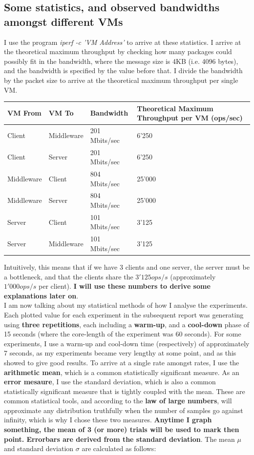 \documentclass[11pt,a4paper]{article}
\begin{document}
\subsection{Some statistics, and observed bandwidths amongst different VMs}
I use the program \textit{iperf -c 'VM Address'} to arrive at these statistics.
I arrive at the theoretical maximum throughput by checking how many packages could possibly fit in the bandwidth, where the message size is 4KB (i.e. 4096 bytes), and the bandwidth is specified by the value before that.
I divide the bandwidth by the packet size to arrive at the theoretical maximum throughput per single VM.

\begin{center}
    \begin{tabular}{| l | l | l | l |}
    \hline
    VM From & VM To & Bandwidth & Theoretical Maximum Throughput per VM (ops/sec)\\ \hline
    Client & Middleware & 201 Mbits/sec &  6'250 \\ \hline
    Client & Server & 201 Mbits/sec & 6'250 \\ \hline
    Middleware & Client & 804 Mbits/sec & 25'000 \\ \hline
    Middleware & Server & 804 Mbits/sec & 25'000 \\ \hline
    Server & Client & 101 Mbits/sec &  3'125 \\ \hline
    Server & Middleware & 101 Mbits/sec & 3'125 \\
    \hline
    \end{tabular}
\end{center}

Intuitively, this means that if we have 3 clients and one server, the server must be a bottleneck, and that the clients share the $3'125 ops/s$ (approximately $1'000ops/s$ per client).
\textbf{I will use these numbers to derive some explanations later on}.\\

I am now talking about my statistical methods of how I analyse the experiments.
Each plotted value for each experiment in the subsequent report was generating using \textbf{three repetitions}, each including a \textbf{warm-up}, and a \textbf{cool-down} phase of 15 seconds (where the core-length of the experiment was 60 seconds).
For some experiments, I use a warm-up and cool-down time (respectively) of approximately 7 seconds, as my experiments became very lengthy at some point, and as this showed to give good results.
To arrive at a single rate amongst rates, I use the \textbf{arithmetic mean}, which is a common statistically significant measure.
As an \textbf{error mesaure}, I use the standard deviation, which is also a common statistically significant measure that is tightly coupled with the mean.
These are common statistical tools, and according to the \textbf{law of large numbers}, will approximate any distribution truthfully when the number of samples go against infinity, which is why I chose these two measures.
\textbf{Anytime I graph something, the mean of 3 (or more) trials will be used to mark then point. 
Errorbars are derived from the standard deviation}.
The mean $\mu$ and standard deviation $\sigma$ are calculated as follows:
\end{document}
